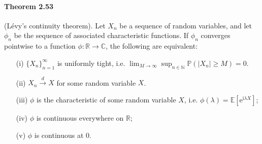 \documentclass{article}
\numberwithin{equation}{section}
\newcommand{\e}{\mathrm{e}}
\newcommand{\E}{\mathbb{E}}
\renewcommand{\P}{\mathbb{P}}
\renewcommand{\i}{\mathrm{i}}
\theoremstyle{plain}
\theoremstyle{definition}
\begin{document}
\paragraph{Theorem 2.53\label{thm:2.53}} (Lévy's continuity theorem). Let $X_n$ be a sequence of random variables, and let $\phi_{n}$ be the sequence of associated characteristic functions. If $\phi_{n}$ converges pointwise to a function $\phi:\mathbb{R}\to\mathbb{C}$, the following are equivalent:
\begin{itemize}
	\item[(i)] $\{X_n\}_{n=1}^\infty$ is uniformly tight, i.e. $\lim_{M\to\infty}\sup_{n\in\mathbb{N}}\P(\vert X_n\vert \geq M)=0$.
	\item[(ii)] $X_n\overset{d}{\to}X$ for some random variable $X$.
	\item[(iii)] $\phi$ is the characteristic of some random variable $X$, i.e. $\phi(\lambda)=\E[\e^{\i\lambda X}]$;
	\item[(iv)] $\phi$ is continuous everywhere on $\mathbb{R}$;
	\item[(v)] $\phi$ is continuous at $0$.
\end{itemize}
\end{document}
